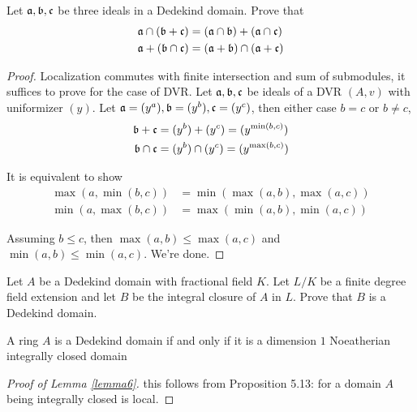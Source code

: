 \begin{problem}
	Let $\mathfrak{a}, \mathfrak{b}, \mathfrak{c}$ be three ideals in a Dedekind domain. Prove that
	\begin{align*}
		\mathfrak{a} \cap (\mathfrak{b} + \mathfrak{c}) &= (\mathfrak{a} \cap \mathfrak{b}) + (\mathfrak{a} \cap \mathfrak{c}) \\
		\mathfrak{a} + (\mathfrak{b} \cap \mathfrak{c}) &= (\mathfrak{a} + \mathfrak{b}) \cap (\mathfrak{a} + \mathfrak{c})
	\end{align*}
\end{problem}

\begin{proof}
	Localization commutes with finite intersection and sum of submodules, it suffices to prove for the case of DVR. Let $\mathfrak{a}, \mathfrak{b}, \mathfrak{c}$ be ideals of a DVR $(A, v)$ with uniformizer $(y)$. Let $\mathfrak{a} = (y^a), \mathfrak{b} = (y^b), \mathfrak{c} = (y^c)$, then either case $b = c$ or $b \neq c$,
	\begin{align*}
		\mathfrak{b} + \mathfrak{c} &= (y^b) + (y^c) = (y^{\min(b, c)}) \\
		\mathfrak{b} \cap \mathfrak{c} &= (y^b) \cap (y^c) = (y^{\max(b, c)})
	\end{align*}
	
	It is equivalent to show
	\begin{align*}
		\max(a, \min(b, c)) &= \min(\max(a, b), \max(a, c)) \\
		\min(a, \max(b, c)) &= \max(\min(a, b), \min(a, c))
	\end{align*}
	
	Assuming $b \leq c$, then $\max(a, b) \leq  \max(a, c)$ and $\min(a, b) \leq \min(a, c)$. We're done.
\end{proof}


\begin{problem}
	Let $A$ be a Dedekind domain with fractional field $K$. Let $L / K$ be a finite degree field extension and let $B$ be the integral closure of $A$ in $L$. Prove that $B$ is a Dedekind domain.
\end{problem}

\begin{lemma}
	\label{lemma6}
	A ring $A$ is a Dedekind domain if and only if it is a dimension $1$ Noeatherian integrally closed domain
\end{lemma}

\begin{proof}[Proof of Lemma \ref{lemma6}]
	this follows from Proposition 5.13: for a domain $A$ being integrally closed is local.
\end{proof}



